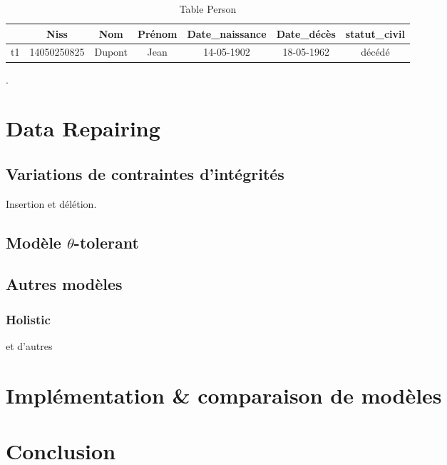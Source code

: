 \documentclass[letterpaper, 12pt]{report}
\begin{document}
\begin{table}[H]
	\centering
	\begin{tabular}{|c|c c c c c c|}
	\hline
	    & Niss & Nom & Prénom & Date\_naissance & Date\_décès & statut\_civil\\
	\hline
	 t1 & 14050250825 & Dupont & Jean & 14-05-1902 & 18-05-1962 & décédé \\
	\hline
	 
	 \hline
	\end{tabular}
	\caption{\label{tableMain} Table Person}.
\end{table}

\section{}

\chapter{Data Repairing}
\section{Variations de contraintes d'intégrités}
Insertion et délétion.
\section{Modèle $\theta$-tolerant}
\section{Autres modèles}
\subsection{Holistic}
 et d'autres

\chapter{Implémentation \& comparaison de modèles}
\chapter{Conclusion}






\newpage
\appendix
\end{document}

